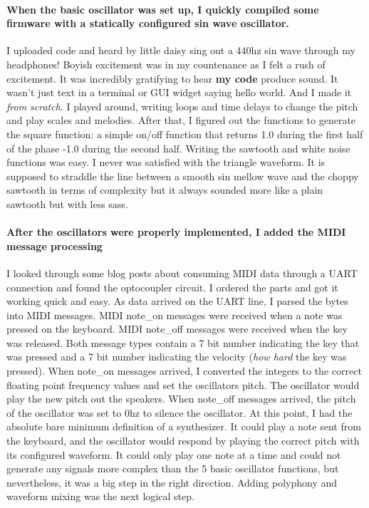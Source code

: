 \documentclass[acmlarge,screen]{acmart}
\begin{document}
	\paragraph{When the basic oscillator was set up, I quickly compiled some firmware with a statically configured sin wave oscillator.} I uploaded code and heard by little daisy sing out a 440hz sin wave through my headphones! Boyish excitement was in my countenance as I felt a rush of excitement. It was incredibly gratifying to hear \textbf{my code} produce sound. It wasn't just text in a terminal or GUI widget saying hello world. And I made it \textit{from scratch}. I played around, writing loops and time delays to change the pitch and play scales and melodies. After that, I figured out the functions to generate the square function: a simple on/off function that returns 1.0 during the first half of the phase -1.0 during the second half. Writing the sawtooth and white noise functions was easy. I never was satisfied with the triangle waveform. It is supposed to straddle the line between a smooth sin mellow wave and the choppy sawtooth in terms of complexity but it always sounded more like a plain sawtooth but with less sass. \cite{tagi_2019}
	
	\paragraph{After the oscillators were properly implemented, I added the MIDI message processing} I looked through some blog posts about consuming MIDI data through a UART connection and found the optocoupler circuit. I ordered the parts and got it working quick and easy. As data arrived on the UART line, I parsed the bytes into MIDI messages. MIDI note\_on messages were received when a note was pressed on the keyboard. MIDI note\_off messages were received when the key was released. Both message types contain a 7 bit number indicating the key that was pressed and a 7 bit number indicating the velocity (\textit{how hard} the key was pressed).\cite{huber_2007} When note\_on messages arrived, I converted the integers to the correct floating point frequency values and set the oscillators pitch. The oscillator would play the new pitch out the speakers. When note\_off messages arrived, the pitch of the oscillator was set to 0hz to silence the oscillator. At this point, I had the absolute bare minimum definition of a synthesizer. It could play a note sent from the keyboard, and the oscillator would respond by playing the correct pitch with its configured waveform. It could only play one note at a time and could not generate any signals more complex than the 5 basic oscillator functions, but nevertheless, it was a big step in the right direction. Adding polyphony and waveform mixing was the next logical step.
\end{document}
